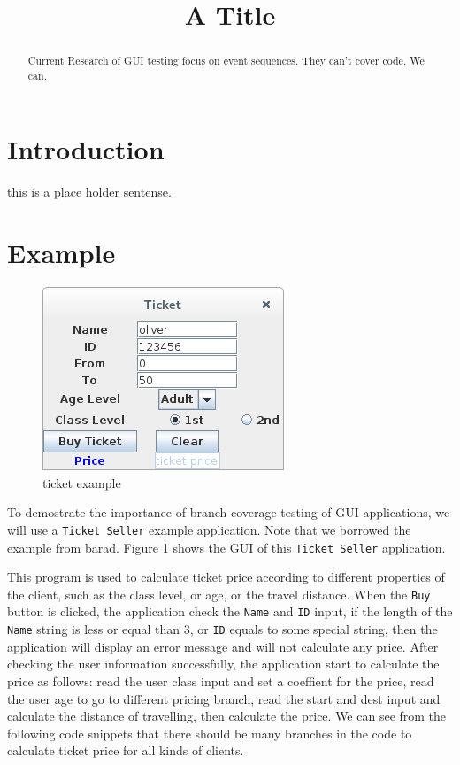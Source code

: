 \documentclass{article}
\begin{document}
\title{A Title}


\maketitle

\begin{abstract}
  Current Research of GUI testing focus on event sequences.
  They can't cover code.
  We can.
\end{abstract}

\section{Introduction}\label{section:introduction}
this is a place holder sentense. \cite{jpf-awt}

\section{Example}

\begin{figure}
  \centering
  \caption{ticket example}
  \includegraphics{./res/ticket.png}
\end{figure}

To demostrate  the importance of branch coverage testing of GUI applications, we will use a  \texttt{Ticket Seller} example application. Note that we borrowed the example from barad. Figure 1 shows the GUI of this \texttt{Ticket Seller} application.

This program is used to calculate ticket price according to different properties of the client, such as the class level, or age, or the travel distance. When the \texttt{Buy} button is clicked, the application check the \texttt{Name} and \texttt{ID} input, if the length of the \texttt{Name} string is less or equal than 3, or \texttt{ID} equals to some special string, then the application will display an error message and will not calculate any price. After checking the user information successfully, the application start to calculate the price as follows: read the user class input and set a coeffient for the price, read the user age to go to different pricing branch, read the start and dest input and calculate the distance of travelling, then calculate the price. We can see from the following code snippets that there should be many branches in the code to calculate ticket price for all kinds of clients.
\end{document}

